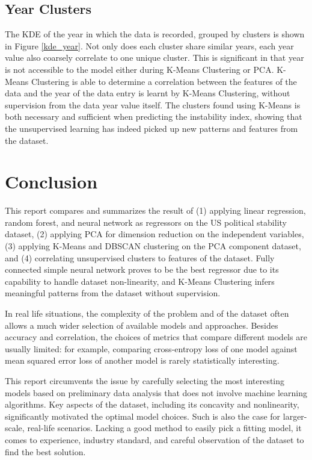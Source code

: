 \documentclass[twocolumn]{article}
\begin{document}
\subsection{Year Clusters}
The KDE of the year in which the data is recorded, grouped by clusters is shown in Figure \ref{kde_year}. Not only does each cluster share similar years, each year value also coarsely correlate to one unique cluster. This is significant in that year is not accessible to the model either during K-Means Clustering or PCA. K-Means Clustering is able to determine a correlation between the features of the data and the year of the data entry is learnt by K-Means Clustering, without supervision from the data year value itself. The clusters found using K-Means is both necessary and sufficient when predicting the instability index, showing that the unsupervised learning has indeed picked up new patterns and features from the dataset.

\section{Conclusion}
This report compares and summarizes the result of (1) applying linear regression, random forest, and neural network as regressors on the US political stability dataset, (2) applying PCA for dimension reduction on the independent variables, (3) applying K-Means and DBSCAN clustering on the PCA component dataset, and (4) correlating unsupervised clusters to features of the dataset. Fully connected simple neural network proves to be the best regressor due to its capability to handle dataset non-linearity, and K-Means Clustering infers meaningful patterns from the dataset without supervision.

In real life situations, the complexity of the problem and of the dataset often allows a much wider selection of available models and approaches. Besides accuracy and correlation, the choices of metrics that compare different models are usually limited: for example, comparing cross-entropy loss of one model against mean squared error loss of another model is rarely statistically interesting.

This report circumvents the issue by carefully selecting the most interesting models based on preliminary data analysis that does not involve machine learning algorithms. Key aspects of the dataset, including its concavity and nonlinearity, significantly motivated the optimal model choices. Such is also the case for larger-scale, real-life scenarios. Lacking a good method to easily pick a fitting model, it comes to experience, industry standard, and careful observation of the dataset to find the best solution.
\end{document}
